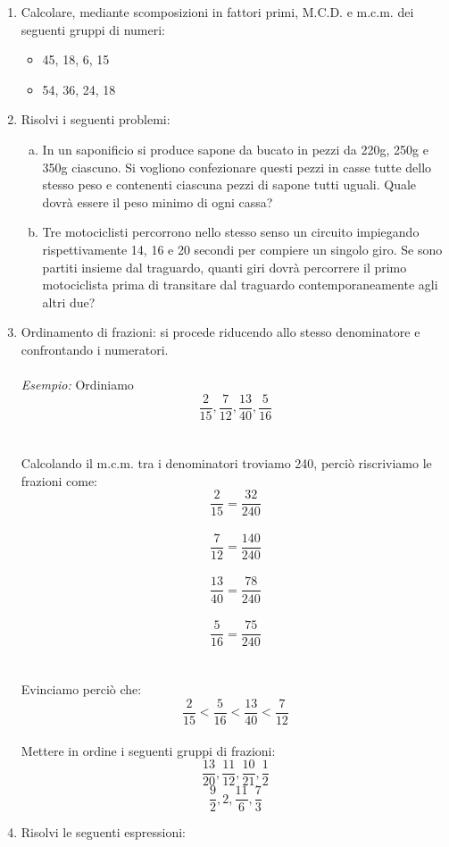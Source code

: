 \documentclass[]{article}
\newcommand*\result[1] {\hspace*{0em plus 1fill}{\footnotesize \makebox{[#1]}}}
\begin{document}
\begin{enumerate}
	\item {Calcolare, mediante scomposizioni in fattori primi, M.C.D. e m.c.m. dei seguenti gruppi di numeri:
		\begin{itemize}
			\item 45, 18, 6, 15
			\item 54, 36, 24, 18
		\end{itemize}
	}

	\item {Risolvi i seguenti problemi:
		\begin{enumerate}[a.]
			\item {In un saponificio si produce sapone da bucato in pezzi da 220g, 250g e 350g ciascuno. Si vogliono confezionare questi pezzi in casse tutte dello stesso peso e contenenti ciascuna pezzi di sapone tutti uguali. Quale dovrà essere il peso minimo di ogni cassa?} \result{38,5}
			\item {Tre motociclisti percorrono nello stesso senso un circuito impiegando rispettivamente 14, 16 e 20 secondi per compiere un singolo giro. Se sono partiti insieme dal traguardo, quanti giri dovrà percorrere il primo motociclista prima di transitare dal traguardo contemporaneamente agli altri due?} \result{40}
		\end{enumerate}
	}

	\item {Ordinamento di frazioni: si procede riducendo allo stesso denominatore e confrontando i numeratori. \\ \\ \textit{Esempio: }Ordiniamo \[\frac{2}{15}, \frac{7}{12}, \frac{13}{40}, \frac{5}{16}\] \\ \\ Calcolando il m.c.m. tra i denominatori troviamo 240, perciò riscriviamo le frazioni come: \\ \[\frac{2}{15} = \frac{32}{240}\] \\ \[\frac{7}{12} = \frac{140}{240}\] \\ \[\frac{13}{40} = \frac{78}{240}\] \\ \[\frac{5}{16} = \frac{75}{240}\]\\\\Evinciamo perciò che: \[\frac{2}{15} < \frac{5}{16} < \frac{13}{40} < \frac{7}{12}\] \\ Mettere in ordine i seguenti gruppi di frazioni: \[\frac{13}{20},\frac{11}{12},\frac{10}{21},\frac12\] \[\frac92,2,\frac{11}{6},\frac73\]
	}

	\item {Risolvi le seguenti espressioni:}	
	

\end{enumerate}
\end{document}

